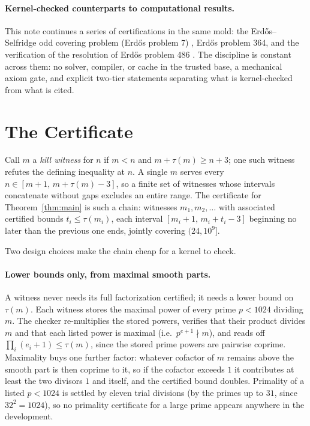 \documentclass[11pt]{article}
\newcommand{\tdiv}{\tau}
\begin{document}
\paragraph{Kernel-checked counterparts to computational results.}
This note continues a series of certifications in the same mold: the
Erd\H{o}s--Selfridge odd covering problem (Erd\H{o}s problem 7)
\cite{mian7}, Erd\H{o}s problem 364, and the verification of the
resolution of Erd\H{o}s problem 486 \cite{pilus}. The discipline is
constant across them: no solver, compiler, or cache in the trusted
base, a mechanical axiom gate, and explicit two-tier statements
separating what is kernel-checked from what is cited.

\section{The Certificate}\label{sec:cert}

Call $m$ a \emph{kill witness} for $n$ if $m < n$ and
$m + \tdiv(m) \ge n + 3$; one such witness refutes the defining
inequality at $n$. A single $m$ serves every
$n \in [m+1,\, m + \tdiv(m) - 3]$, so a finite set of witnesses whose
intervals concatenate without gaps excludes an entire range. The
certificate for Theorem~\ref{thm:main} is such a chain: witnesses
$m_1, m_2, \ldots$ with associated certified bounds
$t_i \le \tdiv(m_i)$, each interval $[m_i + 1,\, m_i + t_i - 3]$
beginning no later than the previous one ends, jointly covering
$(24, 10^9]$.

Two design choices make the chain cheap for a kernel to check.

\paragraph{Lower bounds only, from maximal smooth parts.}
A witness never needs its full factorization certified; it needs a
lower bound on $\tdiv(m)$. Each witness stores the maximal power of
every prime $p < 1024$ dividing $m$. The checker re-multiplies the
stored powers, verifies that their product divides $m$ and that each
listed power is maximal (i.e.\ $p^{e+1} \nmid m$), and reads off
$\prod_i (e_i + 1) \le \tdiv(m)$, since the stored prime powers are
pairwise coprime. Maximality buys one further factor: whatever cofactor
of $m$ remains above the smooth part is then coprime to it, so if the
cofactor exceeds $1$ it contributes at least the two divisors $1$ and
itself, and the certified bound doubles. Primality of a listed
$p < 1024$ is settled by eleven trial divisions (by the primes up to
$31$, since $32^2 = 1024$), so no primality certificate for a large
prime appears anywhere in the development.
\end{document}
